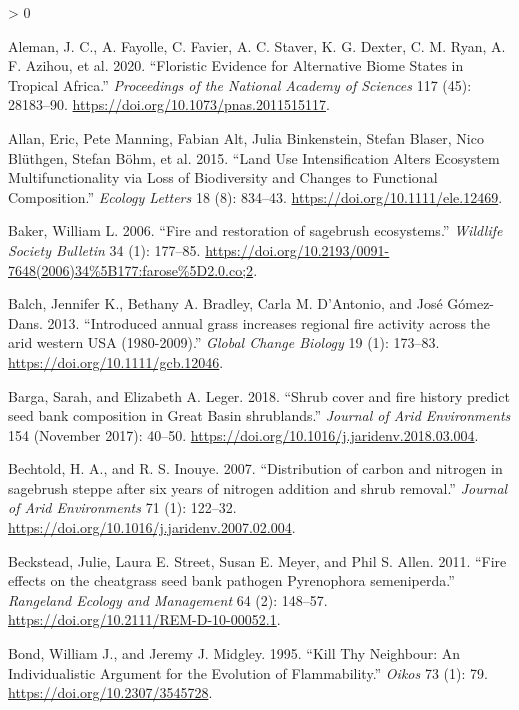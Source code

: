 \documentclass[
  12pt,
]{article}
\newlength{\cslhangindent}
\newenvironment{CSLReferences}[2] %
 {%
  \setlength{\parindent}{0pt}
  \ifodd #1 \everypar{\setlength{\hangindent}{\cslhangindent}}\ignorespaces\fi
  \ifnum #2 > 0
  \setlength{\parskip}{#2\baselineskip}
  \fi
 }%
 {}
\begin{document}
\hypertarget{refs}{}
\begin{CSLReferences}{1}{0}
\leavevmode\hypertarget{ref-Aleman2020}{}%
Aleman, J. C., A. Fayolle, C. Favier, A. C. Staver, K. G. Dexter, C. M.
Ryan, A. F. Azihou, et al. 2020. {``Floristic Evidence for Alternative
Biome States in Tropical {Africa}.''} \emph{Proceedings of the National
Academy of Sciences} 117 (45): 28183--90.
\url{https://doi.org/10.1073/pnas.2011515117}.

\leavevmode\hypertarget{ref-Allan2015}{}%
Allan, Eric, Pete Manning, Fabian Alt, Julia Binkenstein, Stefan Blaser,
Nico Blüthgen, Stefan Böhm, et al. 2015. {``Land Use Intensification
Alters Ecosystem Multifunctionality via Loss of Biodiversity and Changes
to Functional Composition.''} \emph{Ecology Letters} 18 (8): 834--43.
\url{https://doi.org/10.1111/ele.12469}.

\leavevmode\hypertarget{ref-Baker2006}{}%
Baker, William L. 2006. {``{Fire and restoration of sagebrush
ecosystems}.''} \emph{Wildlife Society Bulletin} 34 (1): 177--85.
\url{https://doi.org/10.2193/0091-7648(2006)34\%5B177:farose\%5D2.0.co;2}.

\leavevmode\hypertarget{ref-Balch2013}{}%
Balch, Jennifer K., Bethany A. Bradley, Carla M. D'Antonio, and José
Gómez-Dans. 2013. {``{Introduced annual grass increases regional fire
activity across the arid western USA (1980-2009)}.''} \emph{Global
Change Biology} 19 (1): 173--83.
\url{https://doi.org/10.1111/gcb.12046}.

\leavevmode\hypertarget{ref-Barga2018}{}%
Barga, Sarah, and Elizabeth A. Leger. 2018. {``{Shrub cover and fire
history predict seed bank composition in Great Basin shrublands}.''}
\emph{Journal of Arid Environments} 154 (November 2017): 40--50.
\url{https://doi.org/10.1016/j.jaridenv.2018.03.004}.

\leavevmode\hypertarget{ref-Bechtold2007}{}%
Bechtold, H. A., and R. S. Inouye. 2007. {``{Distribution of carbon and
nitrogen in sagebrush steppe after six years of nitrogen addition and
shrub removal}.''} \emph{Journal of Arid Environments} 71 (1): 122--32.
\url{https://doi.org/10.1016/j.jaridenv.2007.02.004}.

\leavevmode\hypertarget{ref-Beckstead2011}{}%
Beckstead, Julie, Laura E. Street, Susan E. Meyer, and Phil S. Allen.
2011. {``{Fire effects on the cheatgrass seed bank pathogen Pyrenophora
semeniperda}.''} \emph{Rangeland Ecology and Management} 64 (2):
148--57. \url{https://doi.org/10.2111/REM-D-10-00052.1}.

\leavevmode\hypertarget{ref-Bond1995}{}%
Bond, William J., and Jeremy J. Midgley. 1995. {``{Kill Thy Neighbour:
An Individualistic Argument for the Evolution of Flammability}.''}
\emph{Oikos} 73 (1): 79. \url{https://doi.org/10.2307/3545728}.


\end{CSLReferences}
\end{document}
